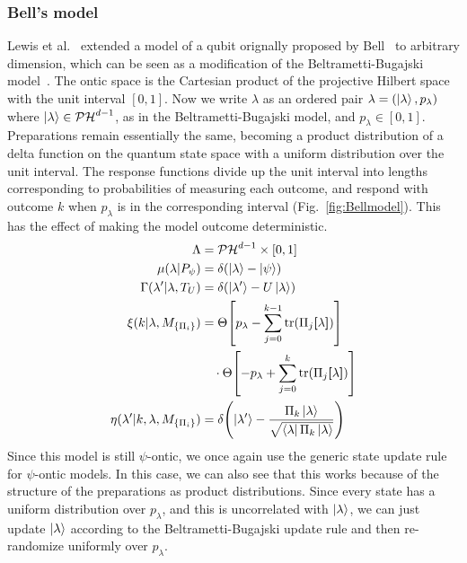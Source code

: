 \documentclass[%
 reprint, onecolumn, 12pt,
superscriptaddress,
nofootinbib,
 prx, 
]{quantumarticle}
\newcommand{\proj}[1]{{\bm[}#1{\bm]}}
\begin{document}
\subsubsection{Bell's model}
\label{sec:bells-model}
Lewis et al.~\cite{LewisDistinctQuantumStates2012} extended a model of
a qubit orignally proposed by
Bell~\cite{BellProblemHiddenVariables1966} to arbitrary dimension,
which can be seen as a modification of the Beltrametti-Bugajski
model~\cite{Leiferquantumstatereal2014}. The ontic space is the
Cartesian product of the projective Hilbert space with the unit
interval $[0,1]$. Now we write $\lambda$ as an ordered pair
$\lambda= (\ket\lambda,p_\lambda)$ where
$\ket\lambda\in\mathcal{PH}^{d-1}$, as in the Beltrametti-Bugajski
model, and $p_\lambda\in[0,1]$. Preparations remain essentially the
same, becoming a product distribution of a delta function on the
quantum state space with a uniform distribution over the unit
interval. The response functions divide up the unit interval into
lengths corresponding to probabilities of measuring each outcome, and
respond with outcome $k$ when $p_\lambda$ is in the corresponding
interval (Fig.~\ref{fig:Bellmodel}). This has the effect of making the
model outcome deterministic.
\begin{align}
  \Lambda&= \mathcal{PH}^{d-1}\times[0,1]\nonumber\\
  \mu(\lambda|P_\psi) &= \delta(\ket\lambda-\ket\psi)\nonumber\\
  \Gamma(\lambda'|\lambda,T_U)
         &= \delta(\ket{\lambda'}-U\ket\lambda)\nonumber\\
  \xi(k|\lambda,M_{\{\Pi_i\}})&= \Theta\qty[p_\lambda-\sum_{j=0}^{k-1}\tr(\Pi_j\proj\lambda)]\nonumber\\
         &\quad\cdot\Theta\qty[-p_\lambda+\sum_{j=0}^{k}\tr(\Pi_j\proj\lambda)]\nonumber\\
  \eta(\lambda'|k,\lambda,M_{\{\Pi_i\}})
         &= \delta\qty(\ket{\lambda'}-\frac{\Pi_k\ket\lambda}
           {\sqrt{\bra\lambda \Pi_k\ket\lambda}})
\end{align}
Since this model is still $\psi$-ontic, we once again use the generic
state update rule for $\psi$-ontic models. In this case, we can also
see that this works because of the structure of the preparations as
product distributions. Since every state has a uniform distribution
over $p_\lambda$, and this is uncorrelated with $\ket\lambda$, we can
just update $\ket\lambda$ according to the Beltrametti-Bugajski update
rule and then re-randomize uniformly over $p_\lambda$.
\end{document}

